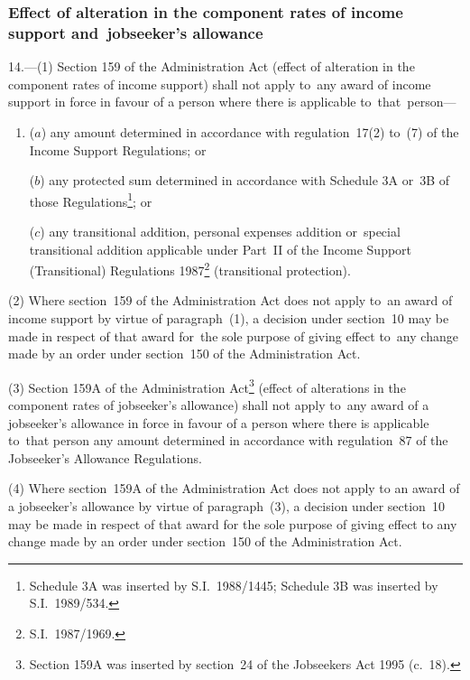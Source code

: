 \documentclass[12pt,a4paper]{article}
\begin{document}

\subsubsection[14. Effect of alteration in the component rates of income support and~jobseeker’s allowance]{\sloppy Effect of alteration in the component rates of income support and~jobseeker’s allowance}

14.—(1) Section 159 of the Administration Act (effect of alteration in the component rates of income support) shall not apply to~any award of income support in force in favour of a person where there is applicable to~that~person—
\begin{enumerate}\item[]
($a$) any amount determined in accordance with regulation~17(2) to~(7) of the Income Support Regulations; or

($b$) any protected sum determined in accordance with Schedule 3A or~3B of those Regulations\footnote{\frenchspacing Schedule 3A was inserted by S.I.~1988/1445; Schedule 3B was inserted by S.I.~1989/534.}; or

($c$) any transitional addition, personal expenses addition or~special transitional addition applicable under Part~II of the Income Support (Transitional) Regulations 1987\footnote{\frenchspacing S.I.~1987/1969.} (transitional protection).
\end{enumerate}

(2) Where section~159 of the Administration Act does not apply to~an award of income support by virtue of paragraph~(1), a decision under section~10 may be made in respect of that award for~the sole purpose of giving effect to~any change made by an order under section~150 of the Administration Act.

(3) Section 159A of the Administration Act\footnote{\frenchspacing Section 159A was inserted by section~24 of the Jobseekers Act 1995 (c.~18).} (effect of alterations in the component rates of jobseeker’s allowance) shall not apply to~any award of a jobseeker’s allowance in force in favour of a person where there is applicable to~that person any amount determined in accordance with regulation~87 of the Jobseeker’s Allowance Regulations.

(4) Where section~159A of the Administration Act does not apply to an award of a jobseeker’s allowance by virtue of paragraph~(3), a decision under section~10 may be made in respect of that award for the sole purpose of giving effect to any change made by an order under section~150 of the Administration Act.
\end{document}
